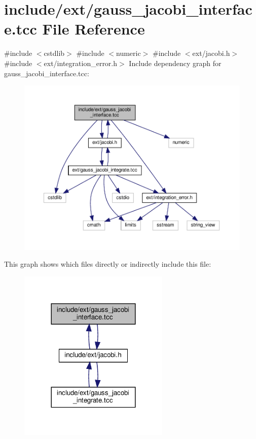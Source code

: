 \hypertarget{gauss__jacobi__interface_8tcc}{}\section{include/ext/gauss\+\_\+jacobi\+\_\+interface.tcc File Reference}
\label{gauss__jacobi__interface_8tcc}
{\ttfamily \#include $<$cstdlib$>$}\newline
{\ttfamily \#include $<$numeric$>$}\newline
{\ttfamily \#include $<$ext/jacobi.\+h$>$}\newline
{\ttfamily \#include $<$ext/integration\+\_\+error.\+h$>$}\newline
Include dependency graph for gauss\+\_\+jacobi\+\_\+interface.\+tcc\+:
\nopagebreak
\begin{figure}[H]
\begin{center}
\leavevmode
\includegraphics[width=350pt]{gauss__jacobi__interface_8tcc__incl}
\end{center}
\end{figure}
This graph shows which files directly or indirectly include this file\+:
\nopagebreak
\begin{figure}[H]
\begin{center}
\leavevmode
\includegraphics[width=204pt]{gauss__jacobi__interface_8tcc__dep__incl}
\end{center}
\end{figure}

